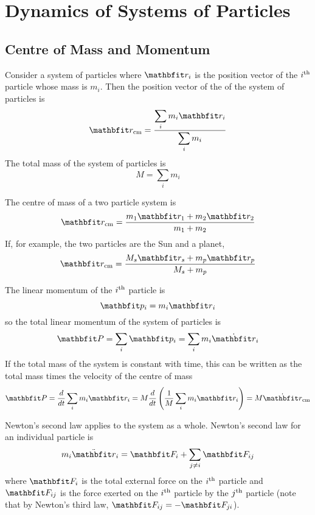 %
%
%
%
%

\chapter{Dynamics of Systems of Particles}
\label{mpd chp}

\section{Centre of Mass and Momentum}

Consider a system of particles where $\vect{r}_i$ is the position vector of
the $i^{\rm th}$ particle whose mass is $m_i$.  Then the position vector of
the  of the system of particles is
$$\vect{r}_{\rm cm}=\frac{\ds\sum_i m_i\vect{r}_i}{\ds\sum_i m_i}$$
The total mass of the system of particles is
$$M=\sum_i m_i$$

\begin{example}
The centre of mass of a two particle system is
$$\vect{r}_{\rm cm}=\frac{m_1\vect{r}_1+m_2\vect{r}_2}{m_1+m_2}$$
If, for example, the two particles are the Sun and a planet,
$$\vect{r}_{\rm cm}=\frac{M_s\vect{r}_s+m_p\vect{r}_p}{M_s+m_p}$$
\end{example}

The linear momentum of the $i^{\rm th}$ particle is
$$\vect{p}_i=m_i\dot{\vect{r}}_i$$
so the total linear momentum of the system of particles is
$$\vect{P}=\sum_i\vect{p}_i=\sum_im_i\dot{\vect{r}}_i$$
If the total mass of the system is constant with time, this can be written 
as the total mass times the velocity of the centre of mass
$$\vect{P}=\dbd{t}\sum_im_i\vect{r}_i=M\dbd{t}\left(\frac{1}{M}
\sum_im_i\vect{r}_i\right)=M\dot{\vect{r}}_{\rm cm}$$

Newton's second law applies to the system as a whole.  Newton's second law
for an individual particle is
$$m_i\ddot{\vect{r}}_i=\vect{F}_i+\sum_{j\neq i}\vect{F}_{ij}$$
where $\vect{F}_i$ is the total external force on the $i^{\rm th}$ particle
and $\vect{F}_{ij}$ is the force exerted on the $i^{\rm th}$ particle by the
$j^{\rm th}$ particle (note that by Newton's third law,
$\vect{F}_{ij}=-\vect{F}_{ji}$).


